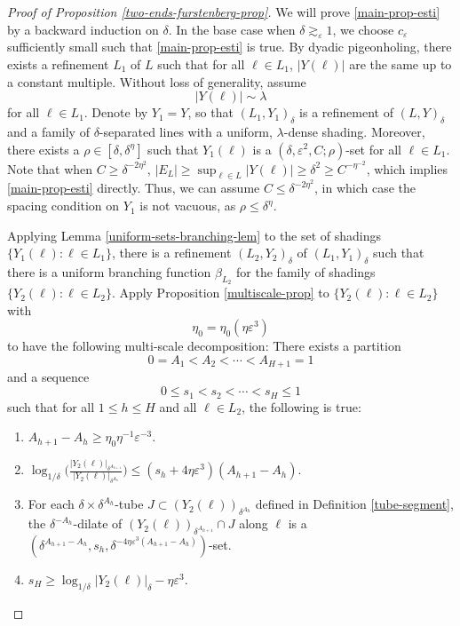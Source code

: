 \documentclass{amsart}
\numberwithin{equation}{section}
\newcommand{\be}{\beta}
\newcommand{\de}{\delta}
\newcommand{\e}{\varepsilon}
\newcommand{\la}{\lambda}
\newcommand{\eps}{\eta}
\begin{document}
\begin{proof}[Proof of Proposition \ref{two-ends-furstenberg-prop}]


We will prove \eqref{main-prop-esti} by a backward induction on $\de$.
In the base case when  $\delta\gtrsim_{\e} 1$, we choose $c_{\e}$ sufficiently small such that \eqref{main-prop-esti} is true.
By dyadic pigeonholing, there exists a refinement $L_1$ of $L$ such that for all $\ell\in L_1$, $|Y(\ell)|$ are the same up to a constant multiple. 
Without loss of generality, assume
\begin{equation}
    |Y(\ell)|\sim\la
\end{equation}
for all $\ell\in L_1$.
Denote by $Y_1=Y$, so that $(L_1,Y_1)_\de$ is a refinement of $(L,Y)_\de$ and a family of $\de$-separated lines with a uniform,  $\lambda$-dense shading.
Moreover, there exists a $\rho\in[\de,\de^{\eta}]$ such that $Y_1(\ell)$ is a $(\de,\e^2,C;\rho)$-set for all $\ell\in L_1$.
Note that when $C\geq \delta^{-2\eta^2}$, $|E_L|\geq\sup_{\ell\in L}|Y(\ell)|\geq\de^2\geq C^{-\eta^{-2}}$, which implies \eqref{main-prop-esti} directly.
Thus, we can assume $C\leq\de^{-2\eta^2}$, in which case the spacing condition on $Y_1$ is not vacuous, as $\rho\leq\de^{\eta}$.





\medskip



Applying Lemma \ref{uniform-sets-branching-lem} to the set of shadings $\{Y_1(\ell): \ell\in L_1\}$, there is a refinement $(L_2,Y_2)_\de$ of  $(L_1,Y_1)_\de$ such that there is a uniform branching function $\be_{L_2}$ for the family of shadings $\{Y_2(\ell): \ell\in L_2\}$. 
Apply Proposition \ref{multiscale-prop} to  $\{Y_2(\ell):\ell\in L_2\}$ with 
\begin{equation}
\label{epsilon}
    \eta_0=\eta_0(\eps\e^3)
\end{equation}
to have the following multi-scale decomposition:  There exists a partition 
\begin{equation}
    0=A_1<A_2<\cdots<A_{H+1}=1
\end{equation}
and a sequence 
\begin{equation}
    0\leq s_1< s_2<\cdots< s_{H}\leq 1
\end{equation}
such that for all $1\leq h\leq H$ and all $\ell\in L_2$, the following is true:
\begin{enumerate}
    \item $A_{h+1}-A_h\geq \eta_0\eta^{-1}\e^{-3}$.
    \item $\log_{1/\de}\big(\frac{|Y_2(\ell)|_{\de^{A_{h+1}}}}{|Y_2(\ell)|_{\de^{A_h}}}\big)\leq (s_h+4\eps\e^3)(A_{h+1}-A_h)$. 
    \item  For each $\de\times\de^{A_{h}}$-tube $J\subset (Y_2(\ell))_{\de^{A_{h}}}$ defined in Definition \ref{tube-segment}, the $\de^{-A_h}$-dilate of $(Y_2(\ell))_{\de^{A_{h+1}}}\cap J$ along $\ell$ is a $(\de^{A_{h+1}-A_h}, s_h, \de^{-4\eps\e^3(A_{h+1}-A_h)})$-set.
    \item $s_H\geq \log_{1/\de}|Y_2(\ell)|_\de-\eps\e^3$.
\end{enumerate}


\end{proof}
\end{document}
